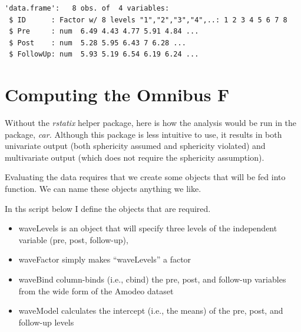\documentclass[
  11pt,
]{book}
\newenvironment{Shaded}{\begin{snugshade}}{\end{snugshade}}
\newcommand{\FunctionTok}[1]{\textcolor[rgb]{0.27,0.27,0.27}{\textbf{#1}}}
\newcommand{\NormalTok}[1]{#1}
\newcommand{\OtherTok}[1]{\textcolor[rgb]{0.37,0.37,0.37}{#1}}
\newcommand{\SpecialCharTok}[1]{\textcolor[rgb]{0.43,0.43,0.43}{\textbf{#1}}}
\providecommand{\tightlist}{%
  \setlength{\itemsep}{0pt}\setlength{\parskip}{0pt}}
\begin{document}
\begin{verbatim}
'data.frame':   8 obs. of  4 variables:
 $ ID      : Factor w/ 8 levels "1","2","3","4",..: 1 2 3 4 5 6 7 8
 $ Pre     : num  6.49 4.43 4.77 5.91 4.84 ...
 $ Post    : num  5.28 5.95 6.43 7 6.28 ...
 $ FollowUp: num  5.93 5.19 6.54 6.19 6.24 ...
\end{verbatim}

\begin{Shaded}
\end{Shaded}

\hypertarget{computing-the-omnibus-f}{%
\section*{Computing the Omnibus F}\label{computing-the-omnibus-f}}


Without the \emph{rstatix} helper package, here is how the analysis would be run in the package, \emph{car.} Although this package is less intuitive to use, it results in both univariate output (both sphericity assumed and sphericity violated) and multivariate output (which does not require the sphericity assumption).

Evaluating the data requires that we create some objects that will be fed into function. We can name these objects anything we like.

In ths script below I define the objects that are required.

\begin{itemize}
\tightlist
\item
  waveLevels is an object that will specify three levels of the independent variable (pre, post, follow-up),
\item
  waveFactor simply makes ``waveLevels'' a factor
\item
  waveBind column-binds (i.e., cbind) the pre, post, and follow-up variables from the wide form of the Amodeo dataset
\item
  waveModel calculates the intercept (i.e., the means) of the pre, post, and follow-up levels
\end{itemize}
\end{document}
